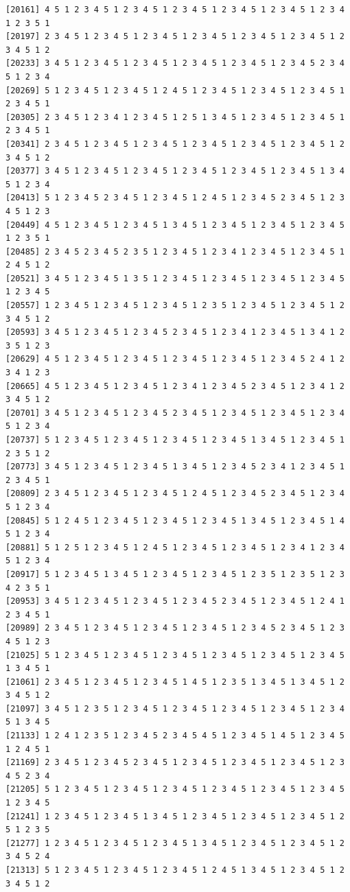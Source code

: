\documentclass[
  11pt,
]{book}
\begin{document}
\begin{verbatim}
[20161] 4 5 1 2 3 4 5 1 2 3 4 5 1 2 3 4 5 1 2 3 4 5 1 2 3 4 5 1 2 3 4 1 2 3 5 1
[20197] 2 3 4 5 1 2 3 4 5 1 2 3 4 5 1 2 3 4 5 1 2 3 4 5 1 2 3 4 5 1 2 3 4 5 1 2
[20233] 3 4 5 1 2 3 4 5 1 2 3 4 5 1 2 3 4 5 1 2 3 4 5 1 2 3 4 5 2 3 4 5 1 2 3 4
[20269] 5 1 2 3 4 5 1 2 3 4 5 1 2 4 5 1 2 3 4 5 1 2 3 4 5 1 2 3 4 5 1 2 3 4 5 1
[20305] 2 3 4 5 1 2 3 4 1 2 3 4 5 1 2 5 1 3 4 5 1 2 3 4 5 1 2 3 4 5 1 2 3 4 5 1
[20341] 2 3 4 5 1 2 3 4 5 1 2 3 4 5 1 2 3 4 5 1 2 3 4 5 1 2 3 4 5 1 2 3 4 5 1 2
[20377] 3 4 5 1 2 3 4 5 1 2 3 4 5 1 2 3 4 5 1 2 3 4 5 1 2 3 4 5 1 3 4 5 1 2 3 4
[20413] 5 1 2 3 4 5 2 3 4 5 1 2 3 4 5 1 2 4 5 1 2 3 4 5 2 3 4 5 1 2 3 4 5 1 2 3
[20449] 4 5 1 2 3 4 5 1 2 3 4 5 1 3 4 5 1 2 3 4 5 1 2 3 4 5 1 2 3 4 5 1 2 3 5 1
[20485] 2 3 4 5 2 3 4 5 2 3 5 1 2 3 4 5 1 2 3 4 1 2 3 4 5 1 2 3 4 5 1 2 4 5 1 2
[20521] 3 4 5 1 2 3 4 5 1 3 5 1 2 3 4 5 1 2 3 4 5 1 2 3 4 5 1 2 3 4 5 1 2 3 4 5
[20557] 1 2 3 4 5 1 2 3 4 5 1 2 3 4 5 1 2 3 5 1 2 3 4 5 1 2 3 4 5 1 2 3 4 5 1 2
[20593] 3 4 5 1 2 3 4 5 1 2 3 4 5 2 3 4 5 1 2 3 4 1 2 3 4 5 1 3 4 1 2 3 5 1 2 3
[20629] 4 5 1 2 3 4 5 1 2 3 4 5 1 2 3 4 5 1 2 3 4 5 1 2 3 4 5 2 4 1 2 3 4 1 2 3
[20665] 4 5 1 2 3 4 5 1 2 3 4 5 1 2 3 4 1 2 3 4 5 2 3 4 5 1 2 3 4 1 2 3 4 5 1 2
[20701] 3 4 5 1 2 3 4 5 1 2 3 4 5 2 3 4 5 1 2 3 4 5 1 2 3 4 5 1 2 3 4 5 1 2 3 4
[20737] 5 1 2 3 4 5 1 2 3 4 5 1 2 3 4 5 1 2 3 4 5 1 3 4 5 1 2 3 4 5 1 2 3 5 1 2
[20773] 3 4 5 1 2 3 4 5 1 2 3 4 5 1 3 4 5 1 2 3 4 5 2 3 4 1 2 3 4 5 1 2 3 4 5 1
[20809] 2 3 4 5 1 2 3 4 5 1 2 3 4 5 1 2 4 5 1 2 3 4 5 2 3 4 5 1 2 3 4 5 1 2 3 4
[20845] 5 1 2 4 5 1 2 3 4 5 1 2 3 4 5 1 2 3 4 5 1 3 4 5 1 2 3 4 5 1 4 5 1 2 3 4
[20881] 5 1 2 5 1 2 3 4 5 1 2 4 5 1 2 3 4 5 1 2 3 4 5 1 2 3 4 1 2 3 4 5 1 2 3 4
[20917] 5 1 2 3 4 5 1 3 4 5 1 2 3 4 5 1 2 3 4 5 1 2 3 5 1 2 3 5 1 2 3 4 2 3 5 1
[20953] 3 4 5 1 2 3 4 5 1 2 3 4 5 1 2 3 4 5 2 3 4 5 1 2 3 4 5 1 2 4 1 2 3 4 5 1
[20989] 2 3 4 5 1 2 3 4 5 1 2 3 4 5 1 2 3 4 5 1 2 3 4 5 2 3 4 5 1 2 3 4 5 1 2 3
[21025] 5 1 2 3 4 5 1 2 3 4 5 1 2 3 4 5 1 2 3 4 5 1 2 3 4 5 1 2 3 4 5 1 3 4 5 1
[21061] 2 3 4 5 1 2 3 4 5 1 2 3 4 5 1 4 5 1 2 3 5 1 3 4 5 1 3 4 5 1 2 3 4 5 1 2
[21097] 3 4 5 1 2 3 5 1 2 3 4 5 1 2 3 4 5 1 2 3 4 5 1 2 3 4 5 1 2 3 4 5 1 3 4 5
[21133] 1 2 4 1 2 3 5 1 2 3 4 5 2 3 4 5 4 5 1 2 3 4 5 1 4 5 1 2 3 4 5 1 2 4 5 1
[21169] 2 3 4 5 1 2 3 4 5 2 3 4 5 1 2 3 4 5 1 2 3 4 5 1 2 3 4 5 1 2 3 4 5 2 3 4
[21205] 5 1 2 3 4 5 1 2 3 4 5 1 2 3 4 5 1 2 3 4 5 1 2 3 4 5 1 2 3 4 5 1 2 3 4 5
[21241] 1 2 3 4 5 1 2 3 4 5 1 3 4 5 1 2 3 4 5 1 2 3 4 5 1 2 3 4 5 1 2 5 1 2 3 5
[21277] 1 2 3 4 5 1 2 3 4 5 1 2 3 4 5 1 3 4 5 1 2 3 4 5 1 2 3 4 5 1 2 3 4 5 2 4
[21313] 5 1 2 3 4 5 1 2 3 4 5 1 2 3 4 5 1 2 4 5 1 3 4 5 1 2 3 4 5 1 2 3 4 5 1 2

\end{verbatim}
\end{document}
